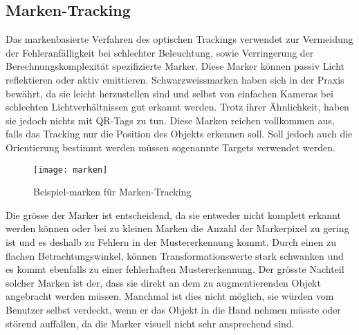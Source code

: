 \subsection*{Marken-Tracking}
Das markenbasierte Verfahren des optischen Trackings verwendet zur Vermeidung der Fehleranfälligkeit bei schlechter Beleuchtung, sowie Verringerung der Berechnungskomplexität spezifizierte Marker. Diese Marker können passiv Licht reflektieren oder aktiv emittieren. Schwarzweissmarken haben sich in der Praxis bewährt, da sie leicht herzustellen sind und selbst von einfachen Kameras bei schlechten Lichtverhältnissen gut erkannt werden. Trotz ihrer Ähnlichkeit, haben sie jedoch nichts mit QR-Tags zu tun. Diese Marken reichen vollkommen aus, falls das Tracking nur die Position des Objekts erkennen soll. Soll jedoch auch die Orientierung bestimmt werden müssen sogenannte Targets verwendet werden.\cite[S.~104~ff.]{doerner13}

\begin{wrapfigure}{r}{0.35\textwidth}
	\vspace{-20pt}
	\begin{center}
		\texttt{[image: marken]}
	\end{center}
	\vspace{-15pt}
	\captionsetup{width=0.3\textwidth}
	\caption{Beispiel-marken für Marken-Tracking}\label{marken}
	\vspace{-12pt}
\end{wrapfigure}
Die grösse der Marker ist entscheidend, da sie entweder nicht komplett erkannt werden können oder bei zu kleinen Marken die Anzahl der Markerpixel zu gering ist und es deshalb zu Fehlern in der Mustererkennung kommt. Durch einen zu flachen Betrachtungswinkel, können Transformationswerte stark schwanken und es kommt ebenfalls zu einer fehlerhaften Mustererkennung. Der grösste Nachteil solcher Marken ist der, dass sie direkt an dem zu augmentierenden Objekt angebracht werden müssen. Manchmal ist dies nicht möglich, sie würden vom Benutzer selbst verdeckt, wenn er das Objekt in die Hand nehmen müsste oder störend auffallen, da die Marker visuell nicht sehr ansprechend sind.\cite[S.~256~ff.]{doerner13}\\[6pt]

